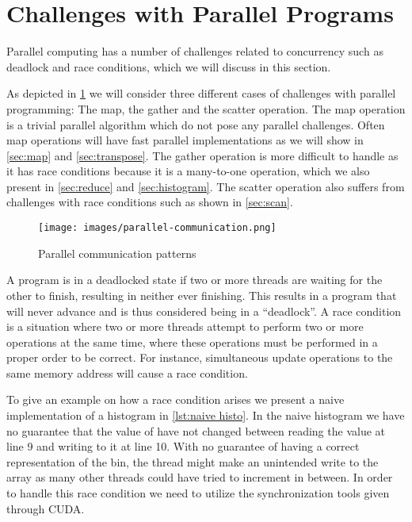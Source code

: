 \section{Challenges with Parallel Programs}
\label{sec:challenges with parallel programs}

Parallel computing has a number of challenges related to concurrency such as deadlock and race conditions, which we will discuss in this section.

As depicted in \cref{fig:parallel patterns} we will consider three different cases of challenges with parallel programming: The map, the gather and the scatter operation.
The map operation is a trivial parallel algorithm which do not pose any parallel challenges.
Often map operations will have fast parallel implementations as we will show in \cref{sec:map} and \cref{sec:transpose}.
The gather operation is more difficult to handle as it has race conditions because it is a many-to-one operation, which we also present in \cref{sec:reduce} and \cref{sec:histogram}.
The scatter operation also suffers from challenges with race conditions such as shown in \cref{sec:scan}.

\begin{figure}[htb]
  \centering
  \texttt{[image: images/parallel-communication.png]}
  \caption{Parallel communication patterns}
  \label{fig:parallel patterns}
\end{figure}

A program is in a deadlocked state if two or more threads are waiting for the other to finish, resulting in neither ever finishing.
This results in a program that will never advance and is thus considered being in a ``deadlock''.
A race condition is a situation where two or more threads attempt to perform two or more operations at the same time, where these operations must be performed in a proper order to be correct.
For instance, simultaneous update operations to the same memory address will cause a race condition.~\cite{farber2011cuda}

To give an example on how a race condition arises we present a naive implementation of a histogram in \cref{lst:naive histo}.
In the naive histogram we have no guarantee that the value of  have not changed between reading the value at line 9 and writing to it at line 10.
With no guarantee of having a correct representation of the bin, the thread might make an unintended write to the array as many other threads could have tried to increment in between.
In order to handle this race condition we need to utilize the synchronization tools given through CUDA.

